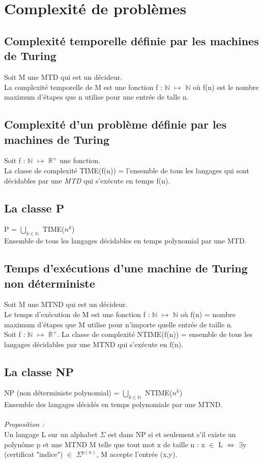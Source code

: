\documentclass[12pt,a4paper]{article}
\begin{document}
\section{Complexité de problèmes}
\subsection{Complexité temporelle définie par les machines de Turing}
Soit M une MTD qui est un décideur.\\
La complexité temporelle de M est une fonction f : $\mathbb{N}$ $\longmapsto$ $\mathbb{N}$ où f(n) est le nombre maximum d'étapes que n utilise pour une entrée de talle n.
\subsection{Complexité d'un problème définie par les machines de Turing}
Soit f : $\mathbb{N}$ $\longmapsto$ $\mathbb{R^+}$ une fonction.\\
La classe de complexité TIME(f(n)) = l'ensemble de tous les langages qui sont décidables par une \textit{MTD} qui s'exécute en temps f(n).
\subsection{La classe P}
P = $\bigcup\limits_{k \in \mathbb{N}}$ TIME($n^k$)\\
Ensemble de tous les langages décidables en temps polynomial par une MTD.
\subsection{Temps d'exécutions  d'une machine de Turing non déterministe}
Soit M une MTND qui est un décideur.\\
Le temps d'exécution de M est une fonction f : $\mathbb{N}$ $\longmapsto$ $\mathbb{N}$ où f(n) = nombre maximum d'étapes que M utilise pour n'importe quelle entrée de taille n.\\
Soit f : $\mathbb{N}$ $\longmapsto$ $\mathbb{R^+}$. La classe de complexité NTIME(f(n)) = ensemble de tous les langages décidables par une MTND qui s'exécute en f(n).
\subsection{La classe NP}
NP (non déterministe polynomial) = $\bigcup\limits_{k \in \mathbb{N}}$ NTIME($n^k$)\\
Ensemble des langages décidés en temps polynomiale par une MTND.\\\\
\textit{Proposition :}\\
Un langage L sur un alphabet $\Sigma$ est dans NP si et seulement s'il existe un polynôme p et une MTND M telle que tout mot x de taille n : x $\in$ L $\Leftrightarrow$ $\exists$y (certificat "indice") $\in$ $\Sigma^{p(n)}$, M accepte l'entrée (x,y).
\end{document}
